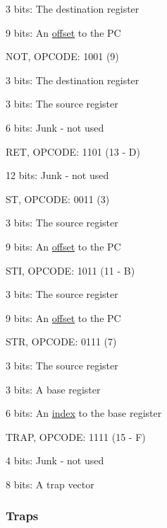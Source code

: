 \begin{DoxyItemize}
\begin{DoxyItemize}
\item 3 bits: The destination register 
\item 9 bits: An \hyperlink{index_offset}{offset} to the PC 
\end{DoxyItemize}\item NOT, OPCODE: 1001 (9) 
\begin{DoxyItemize}
\item 3 bits: The destination register 
\item 3 bits: The source register 
\item 6 bits: Junk -\/ not used 
\end{DoxyItemize}\item RET, OPCODE: 1101 (13 -\/ D) 
\begin{DoxyItemize}
\item 12 bits: Junk -\/ not used 
\end{DoxyItemize}\item ST, OPCODE: 0011 (3) 
\begin{DoxyItemize}
\item 3 bits: The source register 
\item 9 bits: An \hyperlink{index_offset}{offset} to the PC 
\end{DoxyItemize}\item STI, OPCODE: 1011 (11 -\/ B) 
\begin{DoxyItemize}
\item 3 bits: The source register 
\item 9 bits: An \hyperlink{index_offset}{offset} to the PC 
\end{DoxyItemize}\item STR, OPCODE: 0111 (7) 
\begin{DoxyItemize}
\item 3 bits: The source register 
\item 3 bits: A base register 
\item 6 bits: An \hyperlink{index_indexes}{index} to the base register 
\end{DoxyItemize}\item TRAP, OPCODE: 1111 (15 -\/ F) 
\begin{DoxyItemize}
\item 4 bits: Junk -\/ not used 
\item 8 bits: A trap vector 
\end{DoxyItemize}\end{DoxyItemize}
\hypertarget{index_trap}{}\subsubsection{Traps}\label{index_trap}
